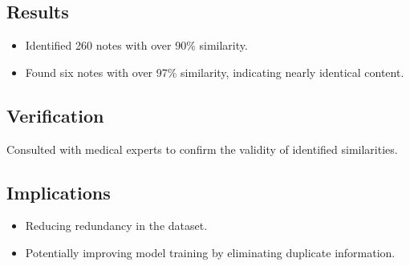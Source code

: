 \documentclass[12pt,a4paper]{report}
\begin{document}
\subsection{Results}
\begin{itemize}
    \item Identified 260 notes with over 90\% similarity.
    \item Found six notes with over 97\% similarity, indicating nearly identical content.
\end{itemize}

\subsection{Verification}
Consulted with medical experts to confirm the validity of identified similarities.

\subsection{Implications}
\begin{itemize}
    \item Reducing redundancy in the dataset.
    \item Potentially improving model training by eliminating duplicate information.
\end{itemize}
\end{document}
